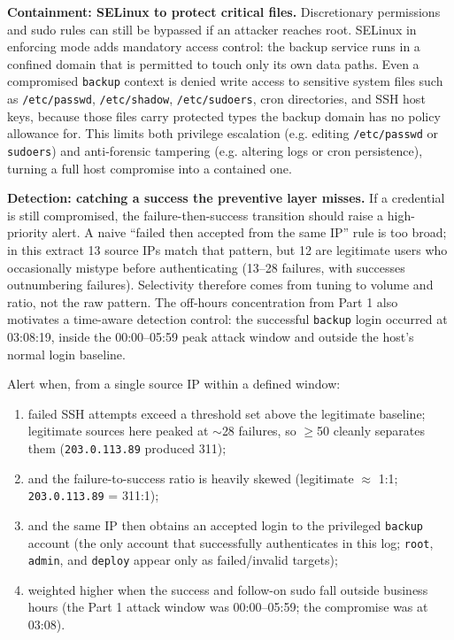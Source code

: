 \documentclass[10pt,a4paper]{article}
\begin{document}
\textbf{Containment: SELinux to protect critical files.} Discretionary permissions and sudo rules can still be bypassed if an attacker reaches root. SELinux in enforcing mode adds mandatory access control: the backup service runs in a confined domain that is permitted to touch only its own data paths. Even a compromised \texttt{backup} context is denied write access to sensitive system files such as \texttt{/etc/passwd}, \texttt{/etc/shadow}, \texttt{/etc/sudoers}, cron directories, and SSH host keys, because those files carry protected types the backup domain has no policy allowance for. This limits both privilege escalation (e.g. editing \texttt{/etc/passwd} or \texttt{sudoers}) and anti-forensic tampering (e.g. altering logs or cron persistence), turning a full host compromise into a contained one.

\textbf{Detection: catching a success the preventive layer misses.} If a credential is still compromised, the failure-then-success transition should raise a high-priority alert. A naive ``failed then accepted from the same IP'' rule is too broad; in this extract 13 source IPs match that pattern, but 12 are legitimate users who occasionally mistype before authenticating (13--28 failures, with successes outnumbering failures). Selectivity therefore comes from tuning to volume and ratio, not the raw pattern. The off-hours concentration from Part 1 also motivates a time-aware detection control: the successful \texttt{backup} login occurred at 03:08:19, inside the 00:00--05:59 peak attack window and outside the host's normal login baseline.

Alert when, from a single source IP within a defined window:
\begin{enumerate}
    \item failed SSH attempts exceed a threshold set above the legitimate baseline; legitimate sources here peaked at $\sim$28 failures, so $\geq$50 cleanly separates them (\texttt{203.0.113.89} produced 311);
    \item and the failure-to-success ratio is heavily skewed (legitimate $\approx$ 1:1; \texttt{203.0.113.89} = 311:1);
    \item and the same IP then obtains an accepted login to the privileged \texttt{backup} account (the only account that successfully authenticates in this log; \texttt{root}, \texttt{admin}, and \texttt{deploy} appear only as failed/invalid targets);
    \item weighted higher when the success and follow-on sudo fall outside business hours (the Part 1 attack window was 00:00--05:59; the compromise was at 03:08).
\end{enumerate}
\end{document}
